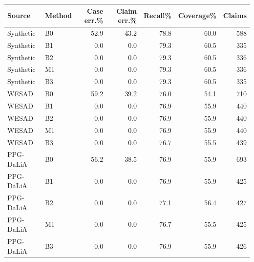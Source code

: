\begin{tabular}{llrrrrr}
\toprule
Source & Method & Case err.\% & Claim err.\% & Recall\% & Coverage\% & Claims \\
\midrule
Synthetic & B0 & 52.9 & 43.2 & 78.8 & 60.0 & 588 \\
Synthetic & B1 & 0.0 & 0.0 & 79.3 & 60.5 & 335 \\
Synthetic & B2 & 0.0 & 0.0 & 79.3 & 60.5 & 336 \\
Synthetic & M1 & 0.0 & 0.0 & 79.3 & 60.5 & 336 \\
Synthetic & B3 & 0.0 & 0.0 & 79.3 & 60.5 & 335 \\
WESAD & B0 & 59.2 & 39.2 & 76.0 & 54.1 & 710 \\
WESAD & B1 & 0.0 & 0.0 & 76.9 & 55.9 & 440 \\
WESAD & B2 & 0.0 & 0.0 & 76.9 & 55.9 & 440 \\
WESAD & M1 & 0.0 & 0.0 & 76.9 & 55.9 & 440 \\
WESAD & B3 & 0.0 & 0.0 & 76.7 & 55.5 & 439 \\
PPG-DaLiA & B0 & 56.2 & 38.5 & 76.9 & 55.9 & 693 \\
PPG-DaLiA & B1 & 0.0 & 0.0 & 76.9 & 55.9 & 425 \\
PPG-DaLiA & B2 & 0.0 & 0.0 & 77.1 & 56.4 & 427 \\
PPG-DaLiA & M1 & 0.0 & 0.0 & 76.7 & 55.5 & 425 \\
PPG-DaLiA & B3 & 0.0 & 0.0 & 76.9 & 55.9 & 426 \\
\bottomrule
\end{tabular}
